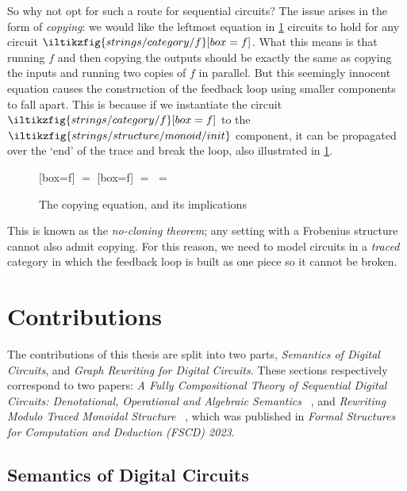 So why not opt for such a route for sequential circuits?
The issue arises in the form of \emph{copying}: we would like the
leftmost equation in \cref{fig:copy} circuits to hold for any circuit \(
\iltikzfig{strings/category/f}[box=f]
\).
What this means is that running \(f\) and then copying the outputs
should be exactly the same as copying the inputs and running two copies of
\(f\) in parallel.
But this seemingly innocent equation causes the construction of the feedback
loop using smaller components to fall apart.
This is because if we instantiate the circuit \(
\iltikzfig{strings/category/f}[box=f]
\) to the \(
\iltikzfig{strings/structure/monoid/init}
\) component, it can be propagated over the `end' of the trace and break the
loop, also illustrated in \cref{fig:copy}.

\begin{figure}
    \centering
    [box=f]
    \(=\)
    [box=f]
    \qquad
    \(=\)
    \qquad
    \(=\)
    \caption{The copying equation, and its implications}
    \label{fig:copy}
\end{figure}

This is known as the \emph{no-cloning theorem}; any setting with a Frobenius
structure cannot also admit copying.
For this reason, we need to model circuits in a \emph{traced} category in which
the feedback loop is built as one piece so it cannot be broken.

\section{Contributions}

The contributions of this thesis are split into two parts,
\emph{Semantics of Digital Circuits}, and
\emph{Graph Rewriting for Digital Circuits}.
These sections respectively correspond to two papers:
\emph{%
    A Fully Compositional Theory of Sequential Digital Circuits:
    Denotational, Operational and Algebraic Semantics%
}~\cite{ghica2024fully}, and \emph{%
    Rewriting Modulo Traced Monoidal Structure%
}~\cite{ghica2023rewriting}, which was published in
\emph{Formal Structures for Computation and Deduction (FSCD) 2023}.

\subsection{Semantics of Digital Circuits}

